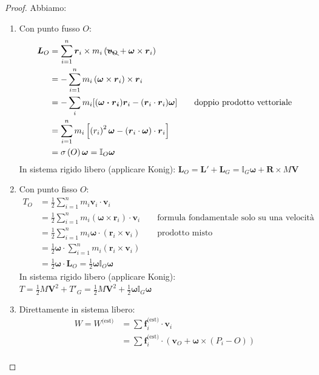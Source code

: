 \documentclass[a4paper,10pt]{article}
\theoremstyle{definition}
\newcommand{\bv}{\boldsymbol} %
\theoremstyle{indentdefinition}
\theoremstyle{indenttheorem}
\theoremstyle{myremark}
\theoremstyle{indentgeneral}
\begin{document}
\begin{proof} Abbiamo:
\begin{enumerate}
    \item Con punto fusso $O$:
\begin{align*}
\boldsymbol{L}_{O} &=\sum_{i=1}^{n}\boldsymbol{r}_{i}\times m_{i}\left(\bcancel{\boldsymbol{v}_{O}}+\boldsymbol{\omega}\times\boldsymbol{r}_{i}\right)\\
&=-\sum_{i=1}^{n}m_{i}\left(\boldsymbol{\omega}\times\boldsymbol{r}_{i}\right)\times\boldsymbol{r}_{i}\\
&=-\sum_im_i[(\bv{\omega\cdot\bv{r}_i})\bv{r}_i-(\bv{r}_i\cdot \bv{r}_i)\bv{\omega}] \qquad \text{doppio prodotto vettoriale} \\
&=\sum_{i=1}^{n}m_{i}\left[\left(r_{i}\right)^{2}\boldsymbol{\omega}-\left(\boldsymbol{r}_{i}\cdot\boldsymbol{\omega}\right)\cdot\boldsymbol{r}_{i}\right]\\
&=\sigma\left(O\right)\boldsymbol{\omega}=\mathbb{I}_{O}\boldsymbol{\omega} 
\end{align*}
In sistema rigido libero (applicare Konig): $\bv{L}_O=\bv{L}'+\bv{L}_G=\mathbb{I}_{G}\boldsymbol{\omega}+\boldsymbol{R}\times M\boldsymbol{V}$
\item  Con punto fisso $O$:
\begin{align*}
    T_O&=\frac{1}{2}\sum_{i=1}^{n}m_{i}\boldsymbol{v}_{i}\cdot\boldsymbol{v}_{i} \\
    &=\frac{1}{2}\sum_{i=1}^{n}m_{i}(\bv{\omega}\times\bv{r}_i)\cdot\boldsymbol{v}_{i} \qquad\text{formula fondamentale solo su una velocità}\\
    &=\frac{1}{2}\sum_{i=1}^{n}m_{i}\bv{\omega}\cdot(\bv{r}_i\times\boldsymbol{v}_{i})\qquad  \text{prodotto misto} \\
  &=\frac{1}{2}\bv{\omega}\cdot\sum_{i=1}^{n}m_{i}(\bv{r}_i\times\boldsymbol{v}_{i}) \\
  &=\frac{1}{2}\bv{\omega}\cdot\bv{L}_O=\frac{1}{2}\bv{\omega}\mathbb{I}_O\bv{\omega}
\end{align*}
In sistema rigido libero (applicare Konig): $T=\frac{1}{2}M\boldsymbol{V}^{2}+T'_G=\frac{1}{2}M\boldsymbol{V}^{2}+\frac{1}{2}\bv{\omega}\mathbb{I}_G\bv{\omega}$
\item Direttamente in sistema libero:
\begin{align*}
W=W^{\text{(est)}}&=\sum\boldsymbol{f}_{i}^{\text{(est)}}\cdot\boldsymbol{v}_{i} \\
&=\sum\boldsymbol{f}_{i}^{\text{(est)}}\cdot\left(\boldsymbol{v}_{O}+\boldsymbol{\omega}\times\left(P_{i}-O\right)\right)\\

\end{align*}
\end{enumerate}
\end{proof}
\end{document}
